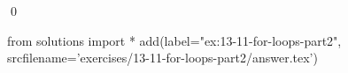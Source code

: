 
\begin{ex}
  \label{ex:13-11-for-loops-part2}
  
  \qed
\end{ex}
\begin{python0}
from solutions import *
add(label="ex:13-11-for-loops-part2",
    srcfilename='exercises/13-11-for-loops-part2/answer.tex')
\end{python0}
